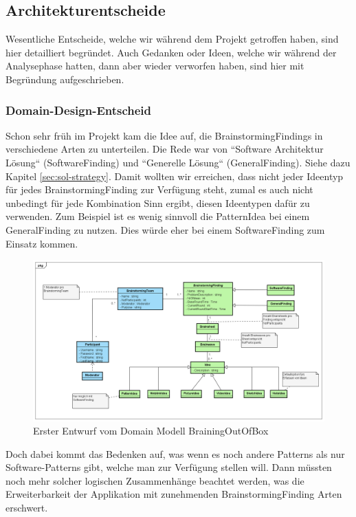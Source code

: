 \subsection{Architekturentscheide}
\label{subsec:architecture-decisions}
Wesentliche Entscheide, welche wir während dem Projekt getroffen haben, sind hier detailliert begründet. Auch Gedanken oder Ideen, welche wir während der Analysephase hatten, dann aber wieder verworfen haben, sind hier mit Begründung aufgeschrieben.

\subsubsection{Domain-Design-Entscheid}
Schon sehr früh im Projekt kam die Idee auf, die BrainstormingFindings in verschiedene Arten zu unterteilen. Die Rede war von ``Software Architektur Lösung`` (SoftwareFinding) und ``Generelle Lösung`` (GeneralFinding). Siehe dazu Kapitel \ref{sec:sol-strategy}. Damit wollten wir erreichen, dass nicht jeder Ideentyp für jedes BrainstormingFinding zur Verfügung steht, zumal es auch nicht unbedingt für jede Kombination Sinn ergibt, diesen Ideentypen dafür zu verwenden. Zum Beispiel ist es wenig sinnvoll die PatternIdea bei einem GeneralFinding zu nutzen. Dies würde eher bei einem SoftwareFinding zum Einsatz kommen.

\begin{figure}[h]
	\centering
	\includegraphics[width=1\linewidth]{img/domain-analyse/DomainModell-Methode635-Entwurf}
	\caption{Erster Entwurf vom Domain Modell BrainingOutOfBox}
	\label{fig:domainmodell-methode635-entwurf}
\end{figure}

Doch dabei kommt das Bedenken auf, was wenn es noch andere Patterns als nur Software-Patterns gibt, welche man zur Verfügung stellen will. Dann müssten noch mehr solcher logischen Zusammenhänge beachtet werden, was die Erweiterbarkeit der Applikation mit zunehmenden BrainstormingFinding Arten erschwert.

